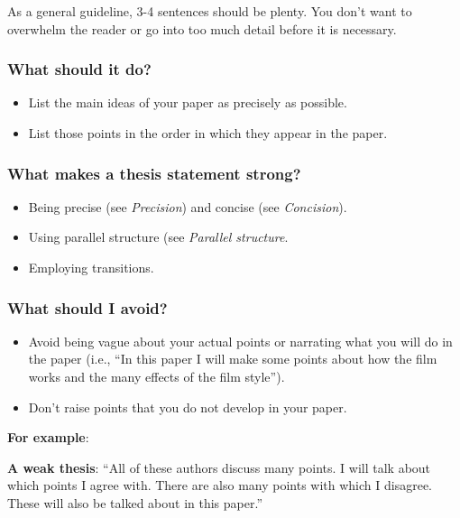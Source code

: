 \documentclass[12pt, hidelinks]{article} %
\begin{document}
As a general guideline, 3-4 sentences should be plenty. You don't want to overwhelm the reader or go into too much detail before it is necessary.

\subsubsection{What should it do?}

\begin{itemize}
\item List the main ideas of your paper as precisely as possible.

\item List those points in the order in which they appear in the paper.

\end{itemize}

\subsubsection{What makes a thesis statement strong?}

\begin{itemize}
\item Being precise (see \emph{Precision}) and concise (see \emph{Concision}).

\item Using parallel structure (see \emph{Parallel structure}.

\item Employing transitions.
\end{itemize}

\subsubsection{What should I avoid?}

\begin{itemize}
\item Avoid being vague about your actual points or narrating what you will do in the paper (i.e., ``In this paper I will make some points about how the film works and the many effects of the film style'').

\item Don't raise points that you do not develop in your paper.

\end{itemize}

\textbf{For example}:

\textbf{A weak thesis}:  “All of these authors discuss many points. I will talk about which points I agree with. There are also many points with which I disagree. These will also be talked about in this paper.”
\end{document}
